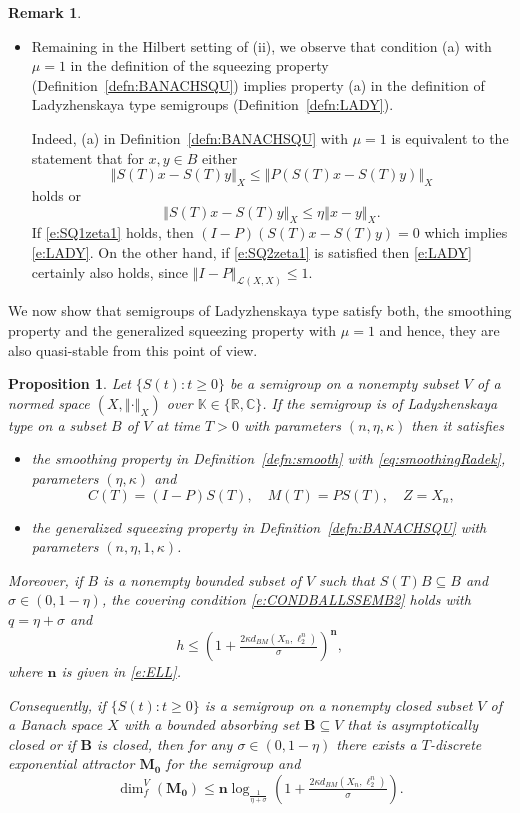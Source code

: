 \documentclass[a4paper,12pt,reqno]{amsart}
\theoremstyle{plain}
\newtheorem{prop}[lem]{Proposition}
\theoremstyle{definition}
\newtheorem{rem}[lem]{Remark}
\numberwithin{equation}{section}
\newcommand{\R}{\mathbb{R}}
\newcommand{\C}{\mathbb{C}}
\newcommand{\K}{\mathbb{K}}
\newcommand{\norm}[1]{\left\Vert#1\right\Vert}
\newcommand{\dimf}{\operatorname{dim}_{f}}
\renewcommand{\geq}{\geqslant}
\renewcommand{\leq}{\leqslant}
\begin{document}
\begin{rem}
\begin{itemize}
\item[(iii)] Remaining in the Hilbert setting of (ii), we observe that condition (a) with $\mu=1$ in the definition of the squeezing property (Definition~\ref{defn:BANACHSQU}) implies property (a) in the definition of Ladyzhenskaya type semigroups (Definition~\ref{defn:LADY}).

Indeed, (a) in Definition~\ref{defn:BANACHSQU}  with $\mu=1$ is equivalent to the statement that for $x,y\in B$ either
\begin{equation}\label{e:SQ1zeta1}
\norm{S(T)x-S(T)y}_{X}\leq\norm{P(S(T)x-S(T)y)}_{X}
\end{equation}
holds or
\begin{equation}\label{e:SQ2zeta1}
\norm{S(T)x-S(T)y}_{X}\leq\eta\norm{x-y}_{X}.
\end{equation}
If \eqref{e:SQ1zeta1} holds, then $(I-P)(S(T)x-S(T)y)=0$ which implies \eqref{e:LADY}. On the other hand, if \eqref{e:SQ2zeta1} is satisfied then \eqref{e:LADY} certainly also holds, since $\norm{I-P}_{\mathcal{L}(X,X)}\leq 1$.
\end{itemize}
\end{rem}

We now show that semigroups of Ladyzhenskaya type satisfy both, the smoothing property and the generalized squeezing property with $\mu=1$ and hence, they are also quasi-stable from this point of view.

\begin{prop}\label{pro:LAD_SQ_SM}
Let $\{S(t)\colon t\geq0\}$ be a semigroup on a nonempty subset $V$ of a normed space $(X,\norm{\cdot}_{X})$ over $\K\in\{\R,\C\}$. If the semigroup is of Ladyzhenskaya type on a subset $B$ of $V$ at time $T>0$ with parameters $(n,\eta,\kappa)$ then it satisfies 
\begin{itemize}
\item[$(i)$] the smoothing property in Definition~\ref{defn:smooth} with \eqref{eq:smoothingRadek}, parameters $(\eta,\kappa)$ and
$$C(T)= (I-P)S(T),\quad M(T)=PS(T),\quad Z=X_n,$$ 
\item[$(ii)$] the generalized squeezing property in Definition~\ref{defn:BANACHSQU} with parameters $(n,\eta,1,\kappa)$. 
\end{itemize}
Moreover, if $B$ is a nonempty bounded subset of $V$ such that $S(T)B\subseteq B$ and $\sigma\in(0,1-\eta)$, the covering condition \eqref{e:CONDBALLSSEMB2} holds with  $q=\eta+\sigma$ and 
$$h\leq\left(1+\tfrac{2\kappa d_{BM}(X_n,\ell^n_2)}{\sigma}\right)^{\mathbf{n}},$$
where $\mathbf{n}$ is given in \eqref{e:ELL}. 

Consequently, if $\{S(t)\colon t\geq 0\}$ is a semigroup on a nonempty closed subset $V$ of a Banach space $X$ with a bounded absorbing set $\mathbf{B}\subseteq V$ that is  asymptotically closed or if $\mathbf{B}$ is closed, then for any $\sigma\in (0,1-\eta)$ there exists a $T$-discrete exponential attractor $\mathbf{M_0}$ for the semigroup and 
\begin{equation*}
\dimf^{V}(\mathbf{M_0})\leq \mathbf{n}\log_{\frac{1}{\eta+\sigma}}\left(1+\tfrac{2\kappa d_{BM}(X_n,\ell^n_2)}{\sigma}\right).
\end{equation*}
\end{prop}
\end{document}
